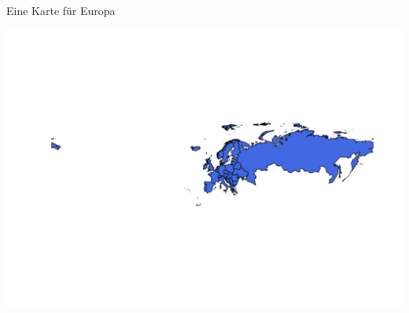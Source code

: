 \documentclass[ignorenonframetext,]{beamer}
\newenvironment{Shaded}{\begin{snugshade}}{\end{snugshade}}
\newcommand{\DataTypeTok}[1]{\textcolor[rgb]{0.74,0.68,0.62}{\underline{#1}}}
\newcommand{\KeywordTok}[1]{\textcolor[rgb]{0.26,0.66,0.93}{\textbf{#1}}}
\newcommand{\NormalTok}[1]{\textcolor[rgb]{0.74,0.68,0.62}{#1}}
\newcommand{\OperatorTok}[1]{\textcolor[rgb]{0.74,0.68,0.62}{#1}}
\newcommand{\StringTok}[1]{\textcolor[rgb]{0.02,0.61,0.04}{#1}}
\begin{document}
\begin{frame}[fragile]{Eine Karte für Europa}
\protect\hypertarget{eine-karte-fur-europa}{}

\begin{Shaded}
\end{Shaded}

\includegraphics{Geomedizin_files/figure-beamer/unnamed-chunk-75-1.pdf}

\end{frame}
\end{document}

